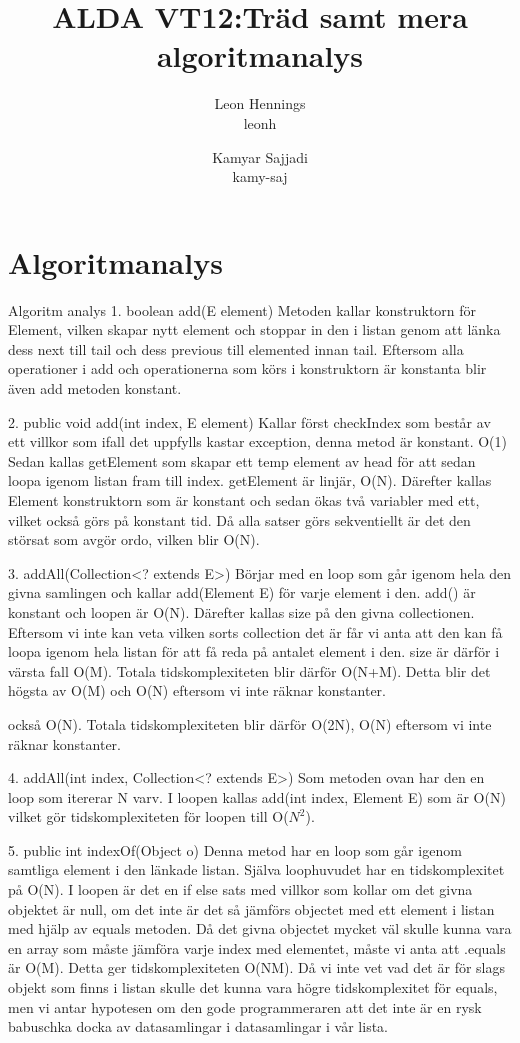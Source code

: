 \documentclass[a4paper,10pt,oneside,onecolumn]{article}
\title{ALDA VT12:Träd samt mera algoritmanalys}
\author{Leon Hennings\\leonh \and Kamyar Sajjadi\\kamy-saj}
\begin{document}
\maketitle

\section{}



\section{Algoritmanalys}
Algoritm analys
1. boolean add(E element)
Metoden kallar konstruktorn för Element, vilken skapar nytt element och stoppar in den i listan genom att länka dess next till tail och dess previous till elemented innan tail.
Eftersom alla operationer i add och operationerna som körs i konstruktorn är konstanta blir även add metoden konstant.

2. public void add(int index, E element)
Kallar först checkIndex som består av ett villkor som ifall det uppfylls kastar exception, denna metod är konstant. O(1)
Sedan kallas getElement som skapar ett temp element av head för att sedan loopa igenom listan fram till index. getElement är linjär, O(N).
Därefter kallas Element konstruktorn som är konstant och sedan ökas två variabler med ett, vilket också görs på konstant tid.
Då alla satser görs sekventiellt är det den störsat som avgör ordo, vilken blir O(N).

3. addAll(Collection<? extends E>)
Börjar med en loop som går igenom hela den givna samlingen och kallar add(Element E) för varje element i den. add() är konstant och loopen är O(N).
Därefter kallas size på den givna collectionen. Eftersom vi inte kan veta vilken sorts collection det är får vi anta att den kan få loopa igenom hela listan för att få reda på antalet element i den.
size är därför i värsta fall O(M). Totala tidskomplexiteten blir därför O(N+M). Detta blir det högsta av O(M) och O(N) eftersom vi inte räknar konstanter.

 också O(N). Totala tidskomplexiteten blir därför O(2N), O(N) eftersom vi inte räknar konstanter.

4. addAll(int index, Collection<? extends E>)
Som metoden ovan har den en loop som itererar N varv. I loopen kallas add(int index, Element E) som är O(N) vilket gör tidskomplexiteten för loopen till O($N^{2}$).

5. public int indexOf(Object o)
Denna metod har en loop som går igenom samtliga element i den länkade listan. Själva loophuvudet har en tidskomplexitet på O(N). I loopen är det en if else sats med villkor som kollar om det givna objektet är null, om det inte är det så jämförs objectet med ett element i listan med hjälp av equals metoden. Då det givna objectet mycket väl skulle kunna vara en array som måste jämföra varje index med elementet, måste vi anta att .equals är O(M).
Detta ger tidskomplexiteten O(NM).
Då vi inte vet vad det är för slags objekt som finns i listan skulle det kunna vara högre tidskomplexitet för equals, men vi antar hypotesen om den gode programmeraren att det inte är en rysk babuschka docka av datasamlingar i datasamlingar i vår lista.
\end{document}
